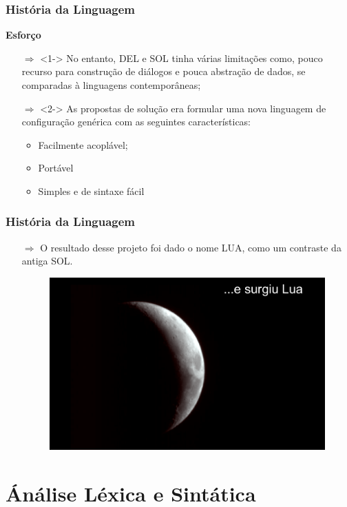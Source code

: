 ﻿\documentclass{beamer}
\begin{document}
\begin{frame}[fragile]
\frametitle{História da Linguagem}
	{\bf Esforço}\vspace{0.2cm}
	\begin{itemize}
		\item[$\Rightarrow$]<1-> No entanto, DEL e SOL tinha várias limitações como, pouco recurso para construção de diálogos e pouca abstração de dados, se comparadas à linguagens contemporâneas;
		\item[$\Rightarrow$]<2-> As propostas de solução era formular uma nova linguagem de configuração genérica com as seguintes características:
		\begin{itemize}
			\item<3-> Facilmente acoplável;
			\item<4-> Portável
			\item<5-> Simples e de sintaxe fácil
		\end{itemize}
	\end{itemize}
\end{frame}

\begin{frame}[fragile]
\frametitle{História da Linguagem}
	\begin{itemize}
		\item[$\Rightarrow$] O resultado desse projeto foi dado o nome LUA, como um contraste da antiga SOL.
		\begin{figure}[!htb]
			\centering
			\includegraphics[width=1\linewidth]{imagens/lua}
		\end{figure}
	\end{itemize}
\end{frame}

\section{Ánálise Léxica e Sintática}
\end{document}
